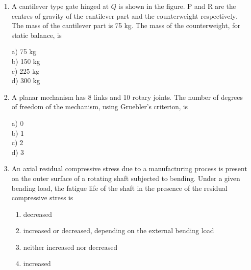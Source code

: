 \documentclass[journal]{IEEEtran}
\begin{document}
\begin{enumerate}
\item A cantilever type gate hinged at $Q$ is shown in the figure. P and R are the centres of gravity of the cantilever part and the counterweight respectively. The mass of the cantilever part is 75 kg. The mass of the counterweight, for static balance, is

\begin{center}
   \scalebox{0.75}{}
\end{center}

\begin{multicols}{4}
     a) 75 kg\\
     b) 150 kg\\
     c) 225 kg\\
     d) 300 kg
 \end{multicols}

\item A planar mechanism has 8 links and 10 rotary joints. The number of degrees of freedom of the mechanism, using Gruebler's criterion, is
\begin{multicols}{4}
     a) 0\\
     b) 1\\
     c) 2\\
     d) 3
 \end{multicols}

\item An axial residual compressive stress due to a manufacturing process is present on the outer surface of a rotating shaft subjected to bending. Under a given bending load, the fatigue life of the shaft in the presence of the residual compressive stress is
\begin{enumerate}
    \item decreased
    \item increased or decreased, depending on the external bending load
    \item neither increased nor decreased
    \item increased
\end{enumerate}


\end{enumerate}
\end{document}

